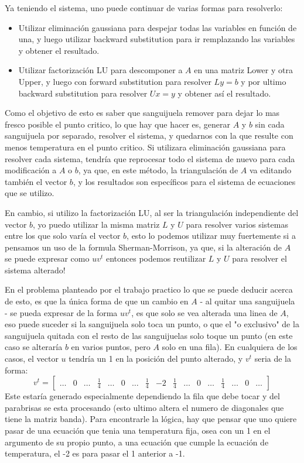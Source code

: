\documentclass[a4paper]{article}
\begin{document}
Ya teniendo el sistema, uno puede continuar de varias formas para resolverlo: 
\begin{itemize}
 \item Utilizar eliminación gaussiana para despejar todas las variables en función de una, y luego utilizar backward substitution para ir remplazando las variables y obtener el resultado.
 \item Utilizar factorización LU para descomponer a $A$ en una matriz Lower y otra Upper, y luego con forward substitution para resolver $Ly = b$ y por ultimo backward substitution para resolver $Ux = y$ y obtener así el resultado.
\end{itemize}

Como el objetivo de esto es saber que sanguijuela remover para dejar lo mas fresco posible el punto critico, lo que hay que hacer es, generar $A$ y $b$ sin cada sanguijuela por separado, resolver el sistema, y quedarnos con la que resulte con menos temperatura en el punto critico. Si utilizara eliminación gaussiana para resolver cada sistema, tendría que reprocesar todo el sistema de nuevo para cada modificación a $A$ o $b$, ya que, en este método, la triangulación de $A$ va editando también el vector $b$, y los resultados son específicos para el sistema de ecuaciones que se utilizo. 

En cambio, si utilizo la factorización LU, al ser la triangulación independiente del vector $b$, yo puedo utilizar la misma matriz $L$ y $U$ para resolver varios sistemas entre los que solo varía el vector $b$, esto lo podemos utilizar muy fuertemente si a pensamos un uso de la formula Sherman-Morrison, ya que, si la alteración de $A$ se puede expresar como $uv^t$ entonces podemos reutilizar $L$ y $U$ para resolver el sistema alterado! 

En el problema planteado por el trabajo practico lo que se puede deducir acerca de esto, es que la única forma de que un cambio en $A$ - al quitar una sanguijuela - se pueda expresar de la forma $uv^t$, es que solo se vea alterada una linea de $A$, eso puede suceder si la sanguijuela solo toca un punto, o que el "o exclusivo" de la sanguijuela quitada con el resto de las sanguijuelas solo toque un punto (en este caso se alteraría $b$ en varios puntos, pero $A$ solo en una fila). En cualquiera de los casos, el vector $u$ tendría un 1 en la posición del punto alterado, y $v^t$ seria de la forma: 
\[
v^t = 
\begin{bmatrix}
  \dots & 0 & \dots & \frac{1}{4} & \dots & 0 & \dots & \frac{1}{4} & -2 & \frac{1}{4} & \dots & 0 & \dots & \frac{1}{4} & \dots & 0 & \dots
\end{bmatrix}
\]
Este estaría generado especialmente dependiendo la fila que debe tocar y del parabrisas se esta procesando (esto ultimo altera el numero de diagonales que tiene la matriz banda). Para encontrarle la lógica, hay que pensar que uno quiere pasar de una ecuación que tenia una temperatura fija, osea con un 1 en el argumento de su propio punto, a una ecuación que cumple la ecuación de temperatura, el -2 es para pasar el 1 anterior a -1.
\end{document}
